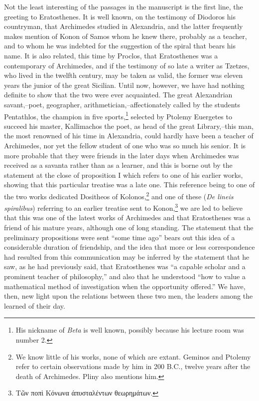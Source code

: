 \documentclass[oneside,12pt]{book}
\begin{document}
Not the least interesting of the passages in the manuscript is the first line, the greeting to Eratosthenes. It is well known, on the testimony of Diodoros his countryman, that Archimedes studied in Alexandria, and the latter frequently makes mention of Konon of Samos whom he knew there, probably as a teacher, and to whom he was indebted for the suggestion of the spiral that bears his name. It is also related, this time by Proclos, that Eratosthenes was a contemporary of Archimedes, and if the testimony of so late a writer as Tzetzes, who lived in the twelfth century, may be taken as valid, the former was eleven years the junior of the great Sicilian. Until now, however, we have had nothing definite to show that the two were ever acquainted. The great Alexandrian savant,--poet, geographer, arithmetician,--affectionately called by the students Pentathlos, the champion in five sports,\footnote{His nickname of \textit{Beta} is well known, possibly because his lecture room was number 2.} selected by Ptolemy Euergetes to succeed his master, Kallimachos the poet, as head of the great Library,--this man, the most renowned of his time in Alexandria, could hardly have been a teacher of Archimedes, nor yet the fellow student of one who was so much his senior. It is more probable that they were friends in the later days when Archimedes was received as a savanta rather than as a learner, and this is borne out by the statement at the close of proposition I which refers to one of his earlier works, showing that this particular treatise was a late one. This reference being to one of the two works dedicated Dositheos of Kolonos,\footnote{We know little of his works, none of which are extant. Geminos and Ptolemy refer to certain observations made by him in 200 B.C., twelve years after the death of Archimedes. Pliny also mentions him.} and one of these (\textit{De lineis spiralibus}) referring to an earlier treatise sent to Konon,\footnote{Τῶν ποπὶ Κόνωνα άπυσταλέντων θεωρημάτων.} we are led to believe that this was one of the latest works of Archimedes and that Eratosthenes was a friend of his mature years, although one of long standing. The statement that the preliminary propositions were sent ``some time ago'' bears out this idea of a considerable duration of friendship, and the idea that more or less correspondence had resulted from this communication may be inferred by the statement that he saw, as he had previously said, that Eratosthenes was ``a capable scholar and a prominent teacher of philosophy,'' and also that he understood ``how to value a mathematical method of investigation when the opportunity offered.'' We have, then, new light upon the relations between these two men, the leaders among the learned of their day. \par 
\end{document}
